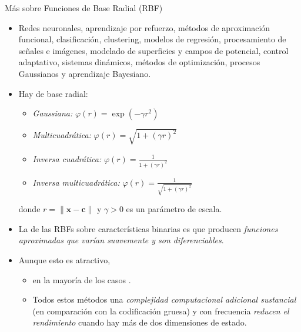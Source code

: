 \documentclass[10pt, envcountsect, handout, aspectratio=1610, hyperref={hypertexnames=true}]{beamer}
\begin{document}
\begin{frame}{Más sobre Funciones de Base Radial (RBF)}
	\begin{itemize}

		\item {} Redes neuronales, aprendizaje por refuerzo, métodos de aproximación funcional, clasificación, clustering, modelos de regresión, procesamiento de señales e imágenes, modelado de superficies y campos de potencial, control adaptativo, sistemas dinámicos, métodos de optimización, procesos Gaussianos y aprendizaje Bayesiano.
		
		\item Hay  de base radial:
		
		\begin{itemize}
			\item \textit{Gaussiana:} 
			$ \varphi(r) = \exp(-\gamma r^2) $
			\item \textit{Multicuadrática:} 
			$ \varphi(r) = \sqrt{1 + (\gamma r)^2} $
			\item \textit{Inversa cuadrática:} 
			$ \varphi(r) = \frac{1}{1 + (\gamma r)^2} $
			\item \textit{Inversa multicuadrática:} 
			$ \varphi(r) = \frac{1}{\sqrt{1 + (\gamma r)^2}} $
		\end{itemize}
		
		
		\hfil donde $ r = \left\| \mathbf{x} - \mathbf{c} \right\| $ y $\gamma > 0$ es un parámetro de escala.
		
		
		\item La  de las RBFs sobre características binarias es que producen \textit{funciones aproximadas que varían suavemente y son diferenciables}.
		
		
		\item Aunque esto es atractivo, 
		\begin{itemize}
			\item en la mayoría de los casos .
		
			\item Todos estos métodos  una \textit{complejidad computacional adicional sustancial} (en comparación con la codificación gruesa) y con frecuencia \textit{reducen el rendimiento} cuando hay más de dos dimensiones de estado.
		\end{itemize}
		
	\end{itemize}

\end{frame}
\end{document}
